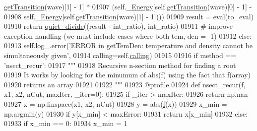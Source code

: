 \begin{DoxyCode}
      \hyperlink{classpyneb_1_1core_1_1pynebcore_1_1_atom_a7c9f17a3d9e841267add92377d9d1ede}{getTransition}(wave)[1] - 1] * 
01907                                    (self.\hyperlink{classpyneb_1_1core_1_1pynebcore_1_1_atom_a52e68715246d258bf0a14f4bd06e89e4}{\_Energy}[self.\hyperlink{classpyneb_1_1core_1_1pynebcore_1_1_atom_a7c9f17a3d9e841267add92377d9d1ede}{getTransition}(wave)[0] - 1] - 
01908                                     self.\hyperlink{classpyneb_1_1core_1_1pynebcore_1_1_atom_a52e68715246d258bf0a14f4bd06e89e4}{\_Energy}[self.\hyperlink{classpyneb_1_1core_1_1pynebcore_1_1_atom_a7c9f17a3d9e841267add92377d9d1ede}{getTransition}(wave)[1] - 1])))
01909                 result = eval(to\_eval)
01910                 \textcolor{keywordflow}{return} \hyperlink{namespacepyneb_1_1utils_1_1misc_afa4163f24be7b1472200c24824c72ae1}{quiet\_divide}((result - int\_ratio), int\_ratio)
01911         \textcolor{comment}{# improve exception handling (we must include cases where both tem, den = -1) }
01912         \textcolor{keywordflow}{else}:
01913             self.log\_.error(\textcolor{stringliteral}{'ERROR in getTemDen: temperature and density cannot be simultaneously given'},
01914                             calling=self.\hyperlink{classpyneb_1_1core_1_1pynebcore_1_1_atom_a373b7735acf4f528b54bddf373ad67a1}{calling})
01915 
01916         \textcolor{keywordflow}{if} method == \textcolor{stringliteral}{'nsect\_recur'}:
01917             \textcolor{stringliteral}{"""}
01918 \textcolor{stringliteral}{            Recursive n-section method for finding a root}
01919 \textcolor{stringliteral}{            It works by looking for the minumum of abs(f) using the fact that f(array) }
01920 \textcolor{stringliteral}{                returns an array}
01921 \textcolor{stringliteral}{}
01922 \textcolor{stringliteral}{            """}
01923             @profile
01924             \textcolor{keyword}{def }nsect\_recur(f, x1, x2, nCut, maxIter, \_iter=0):
01925                 \textcolor{keywordflow}{if} \_iter > maxIter:
01926                     \textcolor{keywordflow}{return} np.nan
01927                 x = np.linspace(x1, x2, nCut)
01928                 y = abs(\hyperlink{namespacepyneb_1_1utils_1_1_fortran_format_af94352584eced016c14d524330879115}{f}(x))
01929                 x\_min = np.argmin(y)
01930                 \textcolor{keywordflow}{if} y[x\_min] < maxError:
01931                     \textcolor{keywordflow}{return} x[x\_min]
01932                 \textcolor{keywordflow}{else}:
01933                     \textcolor{keywordflow}{if} x\_min == 0:
01934                         x\_min = 1

\end{DoxyCode}
